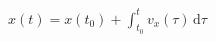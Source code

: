\documentclass[border=2.5pt]{standalone}
\begin{document}
$\displaystyle x(t)=x(t_0)+\int_{t_0}^t v_x(\tau)\,\mathrm d\tau$
\end{document}
